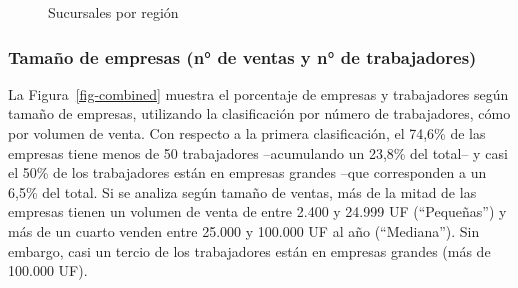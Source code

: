 \documentclass[
  11pt,
]{article}
\begin{document}
\begin{figure}[H]

\caption{\label{fig-mapa-sucursal}Sucursales por región}


\end{figure}%

\FloatBarrier

\subsubsection{Tamaño de empresas (n° de ventas y n° de
trabajadores)}\label{tamauxf1o-de-empresas-n-de-ventas-y-n-de-trabajadores}

La Figura~\ref{fig-combined} muestra el porcentaje de empresas y
trabajadores según tamaño de empresas, utilizando la clasificación por
número de trabajadores, cómo por volumen de venta. Con respecto a la
primera clasificación, el 74,6\% de las empresas tiene menos de 50
trabajadores --acumulando un 23,8\% del total-- y casi el 50\% de los
trabajadores están en empresas grandes --que corresponden a un 6,5\% del
total. Si se analiza según tamaño de ventas, más de la mitad de las
empresas tienen un volumen de venta de entre 2.400 y 24.999 UF
(``Pequeñas'') y más de un cuarto venden entre 25.000 y 100.000 UF al
año (``Mediana''). Sin embargo, casi un tercio de los trabajadores están
en empresas grandes (más de 100.000 UF).
\end{document}
